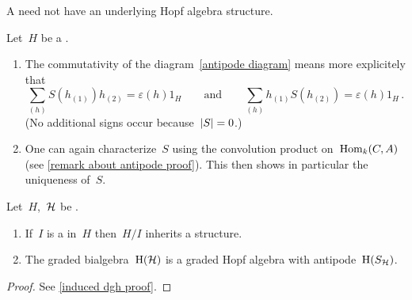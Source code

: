 \documentclass[a4paper,10pt,headings=standardclasses]{scrartcl}
\begin{document}
\begin{warning}
  A {\dgh} need not have an underlying Hopf algebra structure.
\end{warning}

\begin{remark}
  \label{remark about antipode}
  Let~$H$ be a {\dgh}.
  \begin{enumerate}
    \item
      The commutativity of the diagram~\eqref{antipode diagram} means more explicitely that
      \[
        \sum_{(h)} S(h_{(1)}) h_{(2)}
        =
        \varepsilon(h) 1_H
        \qquad\text{and}\qquad
        \sum_{(h)} h_{(1)} S(h_{(2)})
        =
        \varepsilon(h) 1_H  \,.
      \]
      (No additional signs occur because~$\lvert S\rvert = 0$.)
    \item
      One can again characterize~$S$ using the convolution product on~$\operatorname{Hom}_k(C,A)$ (see \cref{remark about antipode proof}).
      This then shows in particular the uniqueness of~$S$.
  \end{enumerate}
\end{remark}

\begin{proposition}
  \label{induced dgh}
  Let~$H$,~$\mathcal{H}$ be {\dghs}.
  \begin{enumerate}
    \item
      If~$I$ is a {\dghi} in~$H$ then~$H/I$ inherits a {\dgh} structure.
    \item
      The graded bialgebra~$\operatorname{H}(\mathcal{H})$ is a graded Hopf algebra with antipode~$\operatorname{H}(S_{\mathcal{H}})$.
  \end{enumerate}
\end{proposition}

\begin{proof}
  See \cref{induced dgh proof}.
\end{proof}
\end{document}
